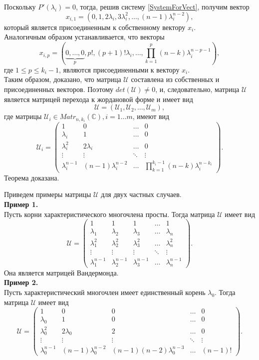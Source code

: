 Поскольку $P'(\lambda_i)=0$, тогда, решив систему \eqref{SystemForVect}, получим вектор 
$$x_{i,1} = \left(0, 1, 2 \lambda_i, 3 \lambda_i ^2, \dots, (n-1)\lambda_i ^{n-2} \right), $$ который является присоединенным к собственному вектору $x_i$. \\
Аналогичным образом устанавливается, что векторы 
$$
x_{i,p} = \left(\underbrace{0, \dots, 0}_{{p}}, p!, (p+1)! \lambda_i, \dots, \prod_{k=1}^p(n-k)\lambda_i ^{n-p-1} \right),
$$
где $1 \le p \le {k_i-1}$, являются присоединенными к вектору $x_i$. \\
Таким образом, доказано, что матрица $\mathcal{U}$ составлена из собственных и присоединенных векторов. Поэтому $det(\mathcal{U}) \ne 0$, и, следовательно, матрица $\mathcal{U}$ является матрицей перехода к жордановой форме и имеет вид 
$$
\mathcal{U} = \left( \mathcal{U}_1, \mathcal{U}_2, \dots, \mathcal{U}_m \right),
$$
где матрицы $\mathcal{U}_i \in Matr_{n,k_i} (\mathbb{C}), i=1 \dots m$, имеют вид
$$
\mathcal{U}_i = \begin{pmatrix}
1 & 0 & \dots & 0 \\
\lambda_i & 1 & \dots & 0 \\ 
\lambda_i^2 & 2\lambda_i & \dots & 0 \\
\vdots & \vdots & \ddots & \vdots \\
\lambda_i^{n-1} & (n-1)\lambda_i^{n-2} & \dots & \prod_{k=1}^{k_i-1}(n-k)\lambda_i^{n-k_i}
\end{pmatrix}.
$$
Теорема доказана. 

Приведем примеры матрицы $\mathcal{U}$ для двух частных случаев.  \\
\textbf{Пример 1.} \\
Пусть корни характеристического многочлена просты. Тогда матрица $\mathcal{U}$ имеет вид
$$
\mathcal{U} = 
\begin{pmatrix}
	1 & 1 & 1 & \dots & 1 \\
	\lambda_1 & \lambda_2 & \lambda_3 & \dots & \lambda_n \\
	\lambda_1 ^ 2 & \lambda_2 ^2 & \lambda_3 ^2 & \dots & \lambda_n ^2 \\
	\vdots & \vdots & \vdots & \ddots & \vdots \\
	\lambda_1 ^{n-1} & \lambda_2 ^{n-1} &\lambda_3 ^{n-1} & \dots & \lambda_n ^{n-1}
\end{pmatrix}.
$$
Она является матрицей Вандермонда. \\
\textbf{Пример 2.}\\
Пусть характеристический многочлен имеет единственный корень $\lambda_0$. Тогда матрица $\mathcal{U}$ имеет вид
$$
\mathcal{U} = 
\begin{pmatrix}
	1 & 0 & 0 & \dots & 0 \\
	\lambda_0 & 1 & 0 & \dots & 0 \\
	\lambda_0 ^ 2 & 2 \lambda_0 & 2 & \dots & 0 \\
	\vdots & \vdots & \vdots & \ddots & \vdots \\
	\lambda_0 ^{n-1} & (n-1)\lambda_0^{n-2} & (n-1)(n-2)\lambda_0^{n-3} & \dots & (n-1)!
\end{pmatrix}.
$$